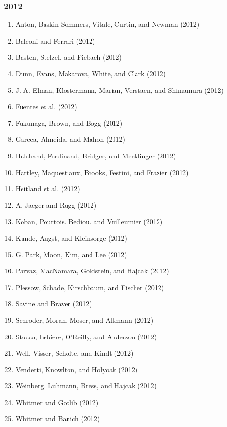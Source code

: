 \documentclass[english,man]{apa6}
\providecommand{\tightlist}{%
  \setlength{\itemsep}{0pt}\setlength{\parskip}{0pt}}
\theoremstyle{definition}
\theoremstyle{definition}
\theoremstyle{definition}
\theoremstyle{remark}
\begin{document}
\subsubsection{2012}\label{section-36}

\begin{enumerate}
\def\labelenumi{\arabic{enumi})}
\tightlist
\item
  Anton, Baskin-Sommers, Vitale, Curtin, and Newman (2012)
\item
  Balconi and Ferrari (2012)
\item
  Basten, Stelzel, and Fiebach (2012)
\item
  Dunn, Evans, Makarova, White, and Clark (2012)
\item
  J. A. Elman, Klostermann, Marian, Verstaen, and Shimamura (2012)
\item
  Fuentes et al. (2012)
\item
  Fukunaga, Brown, and Bogg (2012)
\item
  Garcea, Almeida, and Mahon (2012)
\item
  Halsband, Ferdinand, Bridger, and Mecklinger (2012)
\item
  Hartley, Maquestiaux, Brooks, Festini, and Frazier (2012)
\item
  Heitland et al. (2012)
\item
  A. Jaeger and Rugg (2012)
\item
  Koban, Pourtois, Bediou, and Vuilleumier (2012)
\item
  Kunde, Augst, and Kleinsorge (2012)
\item
  G. Park, Moon, Kim, and Lee (2012)
\item
  Parvaz, MacNamara, Goldstein, and Hajcak (2012)
\item
  Plessow, Schade, Kirschbaum, and Fischer (2012)
\item
  Savine and Braver (2012)
\item
  Schroder, Moran, Moser, and Altmann (2012)
\item
  Stocco, Lebiere, O'Reilly, and Anderson (2012)
\item
  Well, Visser, Scholte, and Kindt (2012)
\item
  Vendetti, Knowlton, and Holyoak (2012)
\item
  Weinberg, Luhmann, Bress, and Hajcak (2012)
\item
  Whitmer and Gotlib (2012)
\item
  Whitmer and Banich (2012)
\end{enumerate}
\end{document}
